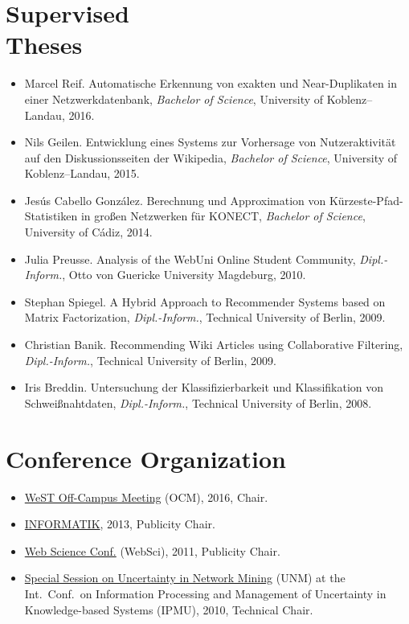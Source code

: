 \documentclass[line,margin]{res}
\begin{document}
\begin{resume}
\section{Supervised \\ Theses}
\begin{itemize}
\item Marcel Reif.  Automatische Erkennung von exakten und
  Near-Duplikaten in einer Netzwerkdatenbank, \emph{Bachelor of
    Science}, University of Koblenz--Landau, 2016.
\item Nils Geilen.  Entwicklung eines Systems zur Vorhersage von
  Nutzeraktivität auf den Diskussionsseiten der Wikipedia,
  \emph{Bachelor of Science}, University of Koblenz--Landau, 2015.
\item Jesús Cabello González.  Berechnung und Approximation von
  Kürzeste-Pfad-Statistiken in großen Netzwerken für KONECT,
  \emph{Bachelor of Science}, University of Cádiz, 2014. 
\item Julia Preusse. Analysis of the WebUni Online Student Community,
  \emph{Dipl.-Inform.}, Otto von Guericke University Magdeburg, 2010.  
\item Stephan Spiegel.  A Hybrid Approach to Recommender Systems based
  on Matrix Factorization, \emph{Dipl.-Inform.}, Technical University of
  Berlin, 2009.  
\item Christian Banik.  Recommending Wiki Articles using Collaborative
  Filtering, \emph{Dipl.-Inform.}, Technical University of Berlin, 2009. 
\item Iris Breddin.  Untersuchung der Klassifizierbarkeit und
  Klassifikation von Schweißnahtdaten, \emph{Dipl.-Inform.}, Technical
  University of Berlin, 2008.    
\end{itemize}

\section{Conference Organization}
\begin{itemize}
\item \href{https://sites.google.com/site/ocm2016/}{WeST Off-Campus
  Meeting} (OCM), 2016, Chair. 
\item \href{http://informatik2013.de/}{INFORMATIK}, 2013, Publicity Chair. 
\item \href{http://www.websci11.org/}{Web Science Conf.} (WebSci), 2011,
  Publicity Chair.  
\item \href{http://www.dai-labor.de/unm2010/}{Special Session on
  Uncertainty in Network Mining} (UNM) at the Int.\ Conf.\ on Information
  Processing and Management of Uncertainty in Knowledge-based Systems (IPMU),
  2010, Technical Chair.   
\end{itemize}


\end{resume}
\end{document}
